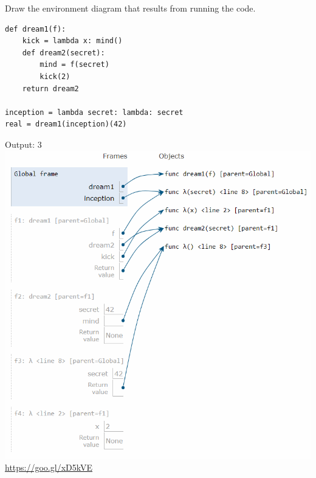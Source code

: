 \begin{blocksection}
\question Draw the environment diagram that results from running the code.

\begin{lstlisting}
def dream1(f):
    kick = lambda x: mind()
    def dream2(secret):
        mind = f(secret)
        kick(2)
    return dream2

inception = lambda secret: lambda: secret
real = dream1(inception)(42)
\end{lstlisting}

\begin{solution}[2in]
Output: 3 \newline
\includegraphics[scale=0.5]{inception.png}
\newline
\url{https://goo.gl/xD5kVE}
\end{solution}
\end{blocksection}

